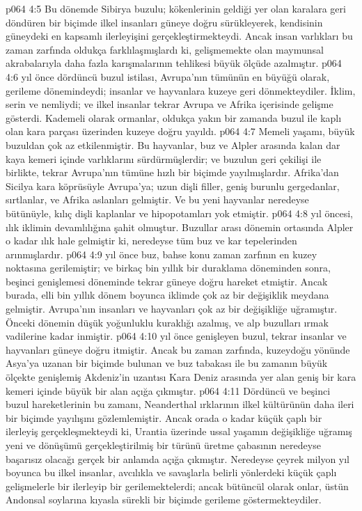 \vs p064 4:5 Bu dönemde Sibirya buzulu; kökenlerinin geldiği yer olan karalara geri döndüren bir biçimde ilkel insanları güneye doğru sürükleyerek, kendisinin güneydeki en kapsamlı ilerleyişini gerçekleştirmekteydi. Ancak insan varlıkları bu zaman zarfında oldukça farklılaşmışlardı ki, gelişmemekte olan maymunsal akrabalarıyla daha fazla karışmalarının tehlikesi büyük ölçüde azalmıştır.
\vs p064 4:6  yıl önce dördüncü buzul istilası, Avrupa’nın tümünün en büyüğü olarak, gerileme dönemindeydi; insanlar ve hayvanlara kuzeye geri dönmekteydiler. İklim, serin ve nemliydi; ve ilkel insanlar tekrar Avrupa ve Afrika içerisinde gelişme gösterdi. Kademeli olarak ormanlar, oldukça yakın bir zamanda buzul ile kaplı olan kara parçası üzerinden kuzeye doğru yayıldı.
\vs p064 4:7 Memeli yaşamı, büyük buzuldan çok az etkilenmiştir. Bu hayvanlar, buz ve Alpler arasında kalan dar kaya kemeri içinde varlıklarını sürdürmüşlerdir; ve buzulun geri çekilişi ile birlikte, tekrar Avrupa’nın tümüne hızlı bir biçimde yayılmışlardır. Afrika’dan Sicilya kara köprüsüyle Avrupa’ya; uzun dişli filler, geniş burunlu gergedanlar, sırtlanlar, ve Afrika aslanları gelmiştir. Ve bu yeni hayvanlar neredeyse bütünüyle, kılıç dişli kaplanlar ve hipopotamları yok etmiştir.
\vs p064 4:8  yıl öncesi, ılık iklimin devamlılığına şahit olmuştur. Buzullar arası dönemin ortasında Alpler o kadar ılık hale gelmiştir ki, neredeyse tüm buz ve kar tepelerinden arınmışlardır.
\vs p064 4:9  yıl önce buz, bahse konu zaman zarfının en kuzey noktasına gerilemiştir; ve birkaç bin yıllık bir duraklama döneminden sonra, beşinci genişlemesi döneminde tekrar güneye doğru hareket etmiştir. Ancak burada, elli bin yıllık dönem boyunca iklimde çok az bir değişiklik meydana gelmiştir. Avrupa’nın insanları ve hayvanları çok az bir değişikliğe uğramıştır. Önceki dönemin düşük yoğunluklu kuraklığı azalmış, ve alp buzulları ırmak vadilerine kadar inmiştir.
\vs p064 4:10  yıl önce genişleyen buzul, tekrar insanlar ve hayvanları güneye doğru itmiştir. Ancak bu zaman zarfında, kuzeydoğu yönünde Asya’ya uzanan bir biçimde bulunan ve buz tabakası ile bu zamanın büyük ölçekte genişlemiş Akdeniz’in uzantısı Kara Deniz arasında yer alan geniş bir kara kemeri içinde büyük bir alan açığa çıkmıştır.
\vs p064 4:11 Dördüncü ve beşinci buzul hareketlerinin bu zamanı, Neanderthal ırklarının ilkel kültürünün daha ileri bir biçimde yayılışını gözlemlemiştir. Ancak orada o kadar küçük çaplı bir ilerleyiş gerçekleşmekteydi ki, Urantia üzerinde ussal yaşamın değişikliğe uğramış yeni ve dönüşümü gerçekleştirilmiş bir türünü üretme çabasının neredeyse başarısız olacağı gerçek bir anlamda açığa çıkmıştır. Neredeyse çeyrek milyon yıl boyunca bu ilkel insanlar, avcılıkla ve savaşlarla belirli yönlerdeki küçük çaplı gelişmelerle bir ilerleyip bir gerilemektelerdi; ancak bütüncül olarak onlar, üstün Andonsal soylarına kıyasla sürekli bir biçimde gerileme göstermekteydiler.
